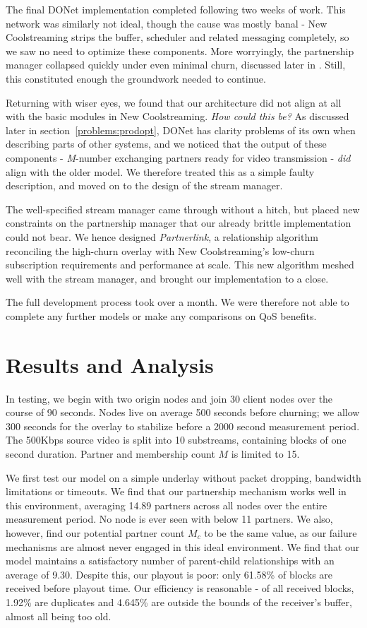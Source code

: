 \documentclass[12pt,a4paper]{article}
\begin{document}
The final DONet implementation completed following two weeks of work. This network was similarly not ideal, though the cause was mostly banal - New Coolstreaming strips the buffer, scheduler and related messaging completely, so we saw no need to optimize these components. More worryingly, the partnership manager collapsed quickly under even minimal churn, discussed later in . Still, this constituted enough the groundwork needed to continue.

Returning with wiser eyes, we found that our architecture did not align at all with the basic modules in New Coolstreaming. \textit{How could this be?} As discussed later in section~\ref{problems:prodopt}, DONet has clarity problems of its own when describing parts of other systems, and we noticed that the output of these components - \textit{M}-number exchanging partners ready for video transmission - \textit{did} align with the older model. We therefore treated this as a simple faulty description, and moved on to the design of the stream manager.

The well-specified stream manager came through without a hitch, but placed new constraints on the partnership manager that our already brittle implementation could not bear. We hence designed \textit{Partnerlink}, a relationship algorithm reconciling the high-churn overlay with New Coolstreaming's low-churn subscription requirements and performance at scale. This new algorithm meshed well with the stream manager, and brought our implementation to a close.

The full development process took over a month. We were therefore not able to complete any further models or make any comparisons on QoS benefits.

\section{Results and Analysis} \label{results}
In testing, we begin with two origin nodes and join 30 client nodes over the course of 90 seconds. Nodes live on average 500 seconds before churning; we allow 300 seconds for the overlay to stabilize before a 2000 second measurement period. The 500Kbps source video is split into 10 substreams, containing blocks of one second duration. Partner and membership count \(M\) is limited to 15.

We first test our model on a simple underlay without packet dropping, bandwidth limitations or timeouts. We find that our partnership mechanism works well in this environment, averaging 14.89 partners across all nodes over the entire measurement period. No node is ever seen with below 11 partners. We also, however, find our potential partner count \(M_c\) to be the same value, as our failure mechanisms are almost never engaged in this ideal environment. We find that our model maintains a satisfactory number of parent-child relationships with an average of 9.30. Despite this, our playout is poor:  only 61.58\% of blocks are received before playout time. Our efficiency is reasonable - of all received blocks, 1.92\% are duplicates and 4.645\% are outside the bounds of the receiver's buffer, almost all being too old.
\end{document}
